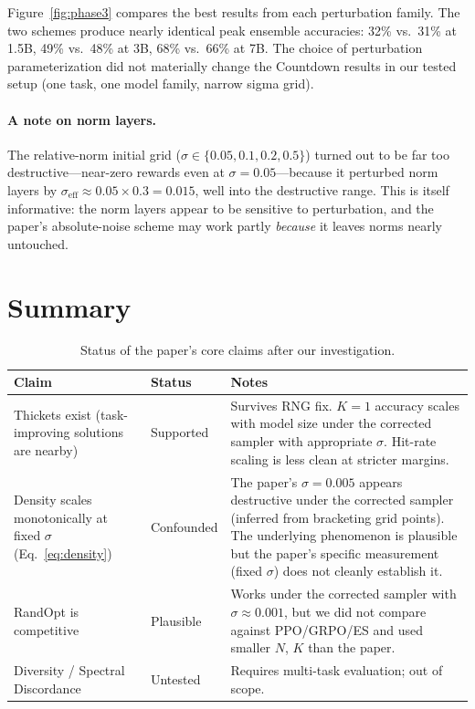 \documentclass[11pt]{article}
\begin{document}
Figure~\ref{fig:phase3} compares the best results from each perturbation family. The two schemes produce nearly identical peak ensemble accuracies: 32\% vs.\ 31\% at 1.5B, 49\% vs.\ 48\% at 3B, 68\% vs.\ 66\% at 7B. The choice of perturbation parameterization did not materially change the Countdown results in our tested setup (one task, one model family, narrow sigma grid).

\paragraph{A note on norm layers.} The relative-norm initial grid ($\sigma\in\{0.05, 0.1, 0.2, 0.5\}$) turned out to be far too destructive---near-zero rewards even at $\sigma=0.05$---because it perturbed norm layers by $\sigma_{\text{eff}}\approx 0.05\times 0.3 = 0.015$, well into the destructive range. This is itself informative: the norm layers appear to be sensitive to perturbation, and the paper's absolute-noise scheme may work partly \emph{because} it leaves norms nearly untouched.


\section{Summary}

\begin{table}[ht]
\centering
\small
\caption{Status of the paper's core claims after our investigation.}\label{tab:summary}
\begin{tabular}{p{4.5cm} p{1.5cm} p{7.5cm}}
\toprule
\textbf{Claim} & \textbf{Status} & \textbf{Notes} \\
\midrule
Thickets exist (task-improving solutions are nearby) & Supported & Survives RNG fix. $K=1$ accuracy scales with model size under the corrected sampler with appropriate $\sigma$. Hit-rate scaling is less clean at stricter margins. \\
\addlinespace
Density scales monotonically at fixed $\sigma$ (Eq.~\ref{eq:density}) & Confounded & The paper's $\sigma=0.005$ appears destructive under the corrected sampler (inferred from bracketing grid points). The underlying phenomenon is plausible but the paper's specific measurement (fixed $\sigma$) does not cleanly establish it. \\
\addlinespace
RandOpt is competitive & Plausible & Works under the corrected sampler with $\sigma\approx 0.001$, but we did not compare against PPO/GRPO/ES and used smaller $N$, $K$ than the paper. \\
\addlinespace
Diversity / Spectral Discordance & Untested & Requires multi-task evaluation; out of scope. \\
\bottomrule
\end{tabular}
\end{table}
\end{document}
